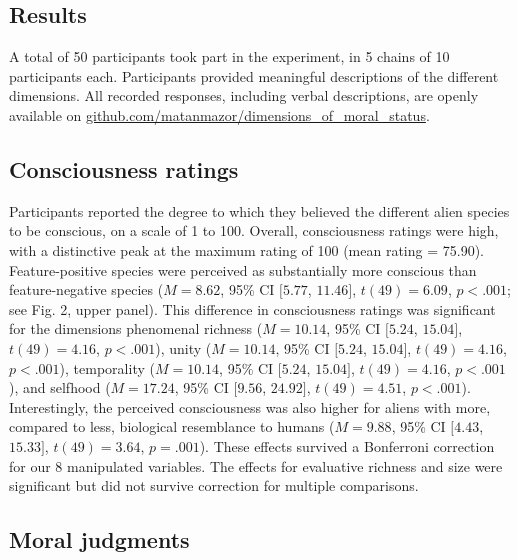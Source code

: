 \documentclass[10pt, letterpaper]{article}
\begin{document}
\hypertarget{results}{%
\subsection{Results}\label{results}}

A total of 50 participants took part in the experiment, in 5 chains of
10 participants each. Participants provided meaningful descriptions of
the different dimensions. All recorded responses, including verbal
descriptions, are openly available on
\href{https://github.com/matanmazor/dimensions_of_moral_status}{github.com/matanmazor/dimensions\_of\_moral\_status}.

\hypertarget{consciousness-ratings}{%
\subsection{Consciousness ratings}\label{consciousness-ratings}}

Participants reported the degree to which they believed the different
alien species to be conscious, on a scale of 1 to 100. Overall,
consciousness ratings were high, with a distinctive peak at the maximum
rating of 100 (mean rating = 75.90). Feature-positive species were
perceived as substantially more conscious than feature-negative species
(\(M = 8.62\), 95\% CI \([5.77\), \(11.46]\), \(t(49) = 6.09\),
\(p < .001\); see Fig. 2, upper panel). This difference in consciousness
ratings was significant for the dimensions phenomenal richness
(\(M = 10.14\), 95\% CI \([5.24\), \(15.04]\), \(t(49) = 4.16\),
\(p < .001\)), unity (\(M = 10.14\), 95\% CI \([5.24\), \(15.04]\),
\(t(49) = 4.16\), \(p < .001\)), temporality (\(M = 10.14\), 95\% CI
\([5.24\), \(15.04]\), \(t(49) = 4.16\), \(p < .001\)), and selfhood
(\(M = 17.24\), 95\% CI \([9.56\), \(24.92]\), \(t(49) = 4.51\),
\(p < .001\)). Interestingly, the perceived consciousness was also
higher for aliens with more, compared to less, biological resemblance to
humans (\(M = 9.88\), 95\% CI \([4.43\), \(15.33]\), \(t(49) = 3.64\),
\(p = .001\)). These effects survived a Bonferroni correction for our 8
manipulated variables. The effects for evaluative richness and size were
significant but did not survive correction for multiple comparisons.

\hypertarget{moral-judgments}{%
\subsection{Moral judgments}\label{moral-judgments}}
\end{document}
